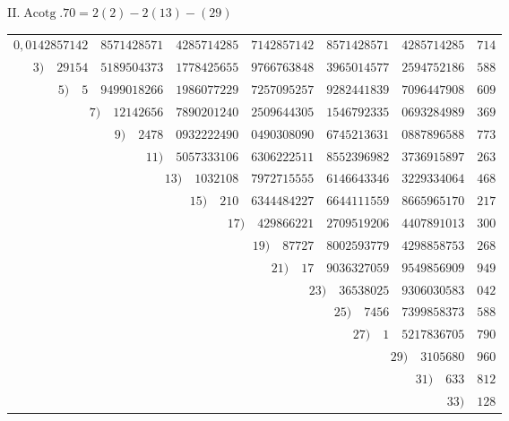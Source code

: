 \par{}
%
\begin{center}II.\quad $\operatorname{Acotg}.70=2(2)-2(13)-(29)$\end{center}
\begingroup\fontsize{8.5}{11}\selectfont\setlength{\tabcolsep}{2pt}
\begin{longtable}{@{}rrrrrrr@{}}
\hline
$0{,}0142857142$ & $8571428571$ & $4285714285$ & $7142857142$ & $8571428571$ & $4285714285$ & $714$\\
$3)\quad 29154$ & $5189504373$ & $1778425655$ & $9766763848$ & $3965014577$ & $2594752186$ & $588$\\
$5)\quad 5$ & $9499018266$ & $1986077229$ & $7257095257$ & $9282441839$ & $7096447908$ & $609$\\
\multicolumn{2}{r}{$7)\quad 12142656$} & $7890201240$ & $2509644305$ & $1546792335$ & $0693284989$ & $369$\\
\multicolumn{2}{r}{$9)\quad 2478$} & $0932222490$ & $0490308090$ & $6745213631$ & $0887896588$ & $773$\\
 & \multicolumn{2}{r}{$11)\quad 5057333106$} & $6306222511$ & $8552396982$ & $3736915897$ & $263$\\
 & \multicolumn{2}{r}{$13)\quad 1032108$} & $7972715555$ & $6146643346$ & $3229334064$ & $468$\\
 & \multicolumn{2}{r}{$15)\quad 210$} & $6344484227$ & $6644111559$ & $8665965170$ & $217$\\
 &  & \multicolumn{2}{r}{$17)\quad 429866221$} & $2709519206$ & $4407891013$ & $300$\\
 &  & \multicolumn{2}{r}{$19)\quad 87727$} & $8002593779$ & $4298858753$ & $268$\\
 &  & \multicolumn{2}{r}{$21)\quad 17$} & $9036327059$ & $9549856909$ & $949$\\
 &  &  & \multicolumn{2}{r}{$23)\quad 36538025$} & $9306030583$ & $042$\\
 &  &  & \multicolumn{2}{r}{$25)\quad 7456$} & $7399858373$ & $588$\\
 &  &  & \multicolumn{2}{r}{$27)\quad 1$} & $5217836705$ & $790$\\
 &  &  &  & \multicolumn{2}{r}{$29)\quad 3105680$} & $960$\\
 &  &  &  & \multicolumn{2}{r}{$31)\quad 633$} & $812$\\
 &  &  &  &  & \multicolumn{2}{r}{$33)\quad 128$}\\

\end{longtable}
